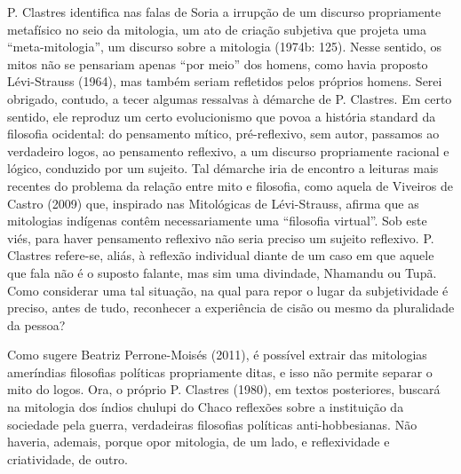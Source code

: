 \documentclass{article}
\begin{document}
P. Clastres identifica nas falas de Soria a irrup\c{c}\~ao de um
discurso propriamente metaf\'isico no seio da mitologia, um ato de
cria\c{c}\~ao subjetiva que projeta uma
{\textquotedblleft}meta-mitologia{\textquotedblright}, um discurso
sobre a mitologia (1974b: 125). Nesse sentido, os mitos n\~ao se
pensariam apenas {\textquotedblleft}por meio{\textquotedblright} dos
homens, como havia proposto L\'evi-Strauss (1964), mas tamb\'em seriam
refletidos pelos pr\'oprios homens. Serei obrigado, contudo, a tecer
algumas ressalvas \`a d\'emarche de P. Clastres. Em certo sentido, ele
reproduz um certo evolucionismo que povoa a hist\'oria standard da
filosofia ocidental: do pensamento m\'itico, pr\'e-reflexivo, sem
autor, passamos ao verdadeiro logos, ao pensamento reflexivo, a um
discurso propriamente racional e l\'ogico, conduzido por um sujeito.
Tal d\'emarche iria de encontro a leituras mais recentes do problema da
rela\c{c}\~ao entre mito e filosofia, como aquela de Viveiros de Castro
(2009) que, inspirado nas Mitol\'ogicas de L\'evi-Strauss, afirma que
as mitologias ind\'igenas cont\^em necessariamente uma
{\textquotedblleft}filosofia virtual{\textquotedblright}. Sob este
vi\'es, para haver pensamento reflexivo n\~ao seria preciso um sujeito
reflexivo. P. Clastres refere-se, ali\'as, \`a reflex\~ao individual
diante de um caso em que aquele que fala n\~ao \'e o suposto falante,
mas sim uma divindade, Nhamandu ou Tup\~a. Como considerar uma tal
situa\c{c}\~ao, na qual para repor o lugar da subjetividade \'e
preciso, antes de tudo, reconhecer a experi\^encia de cis\~ao ou mesmo
da pluralidade da pessoa? 

Como sugere Beatriz Perrone-Mois\'es (2011), \'e poss\'ivel extrair das
mitologias amer\'indias filosofias pol\'iticas propriamente ditas, e
isso n\~ao permite separar o mito do logos. Ora, o pr\'oprio P.
Clastres (1980), em textos posteriores, buscar\'a na mitologia dos
\'indios chulupi do Chaco reflex\~oes sobre a institui\c{c}\~ao da
sociedade pela guerra, verdadeiras filosofias pol\'iticas
anti-hobbesianas. N\~ao haveria, ademais, porque opor mitologia, de um
lado, e reflexividade e criatividade, de outro. 
\end{document}
